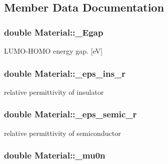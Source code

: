 \subsection{Member Data Documentation}
\hypertarget{classMaterial_aef3731159d1893cbf5e95a7072ff914a}{
\subsubsection[{\-\_\-\-Egap}]{\setlength{\rightskip}{0pt plus 5cm}double Material\-::\-\_\-\-Egap\hspace{0.3cm}{\ttfamily [protected]}}}\label{classMaterial_aef3731159d1893cbf5e95a7072ff914a}
L\-U\-M\-O-\/\-H\-O\-M\-O energy gap. \mbox{[}e\-V\mbox{]} \hypertarget{classMaterial_aa6a5fb9dff802f6a5016ed65b20f3160}{
\subsubsection[{\-\_\-eps\-\_\-ins\-\_\-r}]{\setlength{\rightskip}{0pt plus 5cm}double Material\-::\-\_\-eps\-\_\-ins\-\_\-r\hspace{0.3cm}{\ttfamily [protected]}}}\label{classMaterial_aa6a5fb9dff802f6a5016ed65b20f3160}
relative permittivity of insulator \hypertarget{classMaterial_a6a82dba4b8291e2bf1db15d72f45b0ab}{
\subsubsection[{\-\_\-eps\-\_\-semic\-\_\-r}]{\setlength{\rightskip}{0pt plus 5cm}double Material\-::\-\_\-eps\-\_\-semic\-\_\-r\hspace{0.3cm}{\ttfamily [protected]}}}\label{classMaterial_a6a82dba4b8291e2bf1db15d72f45b0ab}
relative permittivity of semiconductor \hypertarget{classMaterial_a6f71ecccbd8bdab525a92c3328bb079e}{
\subsubsection[{\-\_\-mu0n}]{\setlength{\rightskip}{0pt plus 5cm}double Material\-::\-\_\-mu0n\hspace{0.3cm}{\ttfamily [protected]}}}\label{classMaterial_a6f71ecccbd8bdab525a92c3328bb079e}
